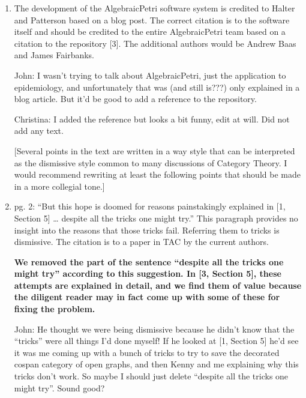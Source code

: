 \documentclass[reqno]{amsart}
\def\chris{\color{purple} Christina: }
\def\john{\color{red} John: }
\begin{document}
\begin{enumerate}
{\bf We do not know a semantics for dynamical systems that uses structured cospans; to find one would
require getting around the result at the end of Section 6.}

{\chris Should we refer to which result we are talking about? Also, I am a bit confused about the question and answer. I thought reaction networks 
can be described in both ways?}

\item The development of the AlgebraicPetri software system is credited to Halter and Patterson based on a blog post. The correct citation is to the 
software itself and should be credited to the entire AlgebraicPetri team based on a citation to the repository [3]. The additional authors would be 
Andrew Baas and James Fairbanks.

{\john I wasn't trying to talk about AlgebraicPetri, just the application to epidemiology, and unfortunately that was (and still is???) only explained 
in a blog article. But it'd be good to add a reference to the repository.}

{\chris I added the reference but looks a bit funny, edit at will. Did not add any text.}

[Several points in the text are written in a way style that can be interpreted as the dismissive style common to many discussions of Category 
Theory. I 
would recommend rewriting at least the following points that should be made in a more collegial tone.]

\item pg. 2: “But this hope is doomed for reasons painstakingly explained in [1, Section 5] … despite all the tricks one might try.” This paragraph 
provides 
no insight into the reasons that those tricks fail. Referring them to tricks is dismissive. The citation is to a paper in TAC by the current authors.

{\bf We removed the part of the sentence ``despite all the tricks one might try'' according to this suggestion. In [3, Section 5], these attempts are 
explained in detail, and we find them of value because the diligent reader may in fact come up with some of these for fixing the problem.}

{\john He thought we were being dismissive because he didn't know that the ``tricks'' were all things I'd done myself!  If he looked at [1, Section 5] 
he'd see it was me coming up with a bunch of tricks to try to save the decorated cospan category of open graphs, and then Kenny and me explaining why 
this tricks don't work.  So maybe I should just delete ``despite all the tricks one might try''.  Sound good?}


\end{enumerate}
\end{document}
